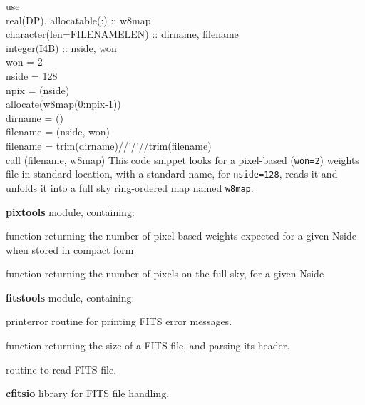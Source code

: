 \begin{example}
{
use \\
real(DP), allocatable(:) :: w8map\\
character(len=FILENAMELEN) :: dirname, filename \\
integer(I4B) :: nside, won\\
%
won = 2\\
nside = 128\\
npix = (nside)\\
allocate(w8map(0:npix-1))\\
dirname  = ()\\
filename = (nside, won)\\
filename = trim(dirname)//'/'//trim(filename)\\
call \thedocid(filename, w8map)}%
{This code snippet looks for a pixel-based (\texttt{won=2}) weights file in standard location, with a standard name, 
for \texttt{nside=128}, reads it and unfolds it into a full sky ring-ordered map named \texttt{w8map}.
}
\end{example}

\begin{modules}
  \begin{sulist}{} %
  \item[\textbf{pixtools}] module, containing:
  \item[\htmlref{nside2npweights}{sub:nside2npweights}] function returning the number of pixel-based weights expected for a given Nside when stored in compact form
  \item[\htmlref{nside2npix}{sub:nside2npix}] function returning the number of pixels on the full sky, for a given Nside
  \item[\textbf{fitstools}] module, containing:
  \item[printerror] routine for printing FITS error messages.
  \item[\htmlref{getsize\_fits}{sub:getsize_fits}] function returning the size of a FITS file, and parsing its header.
  \item[\htmlref{input\_map}{sub:input_map}] routine to read FITS file.
  \item[\textbf{cfitsio}] library for FITS file handling.		
  \end{sulist}
\end{modules}

